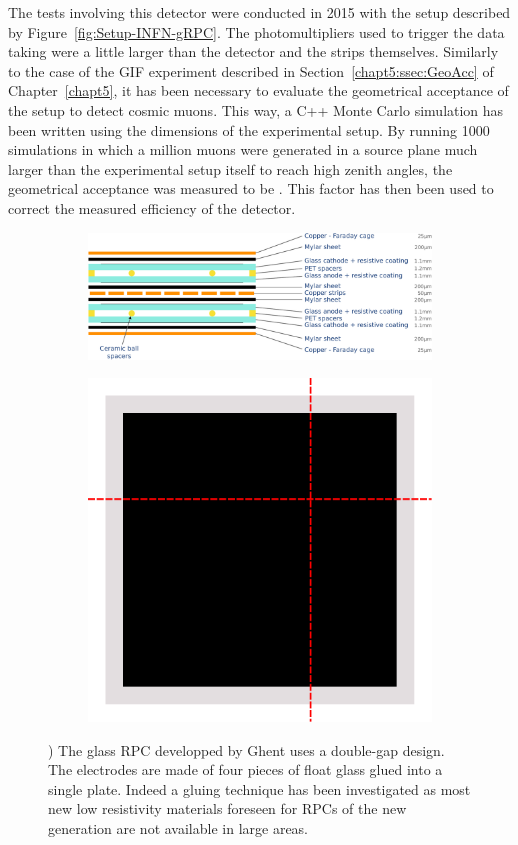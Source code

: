     The tests involving this detector were conducted in 2015 with the setup described by Figure~\ref{fig:Setup-INFN-gRPC}. The photomultipliers used to trigger the data taking were a little larger than the detector and the strips themselves. Similarly to the case of the GIF experiment described in Section~\ref{chapt5:ssec:GeoAcc} of Chapter~\ref{chapt5}, it has been necessary to evaluate the geometrical acceptance of the setup to detect cosmic muons. This way, a C++ Monte Carlo simulation has been written using the dimensions of the experimental setup. By running 1000 simulations in which a million muons were generated in a source plane much larger than the experimental setup itself to reach high zenith angles, the geometrical acceptance was measured to be . This factor has then been used to correct the measured efficiency of the detector.
	 
	\begin{figure}[H]
		\begin{subfigure}{\linewidth}
		    \centering
			\includegraphics[width = .8\linewidth]{fig/chapt6/gRPC-design.pdf}
			\caption{\label{fig:UGent-gRPC-design:A}}
		\end{subfigure}
		\begin{subfigure}{\linewidth}
		    \centering
			\includegraphics[width = .35\linewidth]{fig/chapt6/gRPC-assembly.pdf}
			\caption{\label{fig:UGent-gRPC-design:B}}
		\end{subfigure}
		\caption{\label{fig:UGent-gRPC-design} ) The glass RPC developped by Ghent uses a double-gap design.  The electrodes are made of four pieces of float glass glued into a single plate. Indeed a gluing technique has been investigated as most new low resistivity materials foreseen for RPCs of the new generation are not available in large areas.}
    \end{figure}
	 
